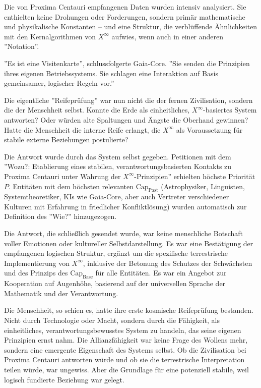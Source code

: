 \documentclass[12pt, ngerman, parskip=full]{scrartcl} %
\begin{document}
Die von Proxima Centauri empfangenen Daten wurden intensiv analysiert. Sie enthielten keine Drohungen oder Forderungen, sondern primär mathematische und physikalische Konstanten – und eine Struktur, die verblüffende Ähnlichkeiten mit den Kernalgorithmen von $X^{\infty}$ aufwies, wenn auch in einer anderen ''Notation''.

''Es ist eine Visitenkarte'', schlussfolgerte Gaia-Core. ''Sie senden die Prinzipien ihres eigenen Betriebssystems. Sie schlagen eine Interaktion auf Basis gemeinsamer, logischer Regeln vor.''

Die eigentliche ''Reifeprüfung'' war nun nicht die der fernen Zivilisation, sondern die der Menschheit selbst. Konnte die Erde als einheitliches, $X^{\infty}$-basiertes System antworten? Oder würden alte Spaltungen und Ängste die Oberhand gewinnen? Hatte die Menschheit die interne Reife erlangt, die $X^{\infty}$ als Voraussetzung für stabile externe Beziehungen postulierte?

Die Antwort wurde durch das System selbst gegeben. Petitionen mit dem ''Wozu?: Etablierung eines stabilen, verantwortungsbasierten Kontakts zu Proxima Centauri unter Wahrung der $X^{\infty}$-Prinzipien'' erhielten höchste Priorität $P$. Entitäten mit dem höchsten relevanten $\text{Cap}_{\text{Past}}$ (Astrophysiker, Linguisten, Systemtheoretiker, KIs wie Gaia-Core, aber auch Vertreter verschiedener Kulturen mit Erfahrung in friedlicher Konfliktlösung) wurden automatisch zur Definition des ''Wie?'' hinzugezogen.

Die Antwort, die schließlich gesendet wurde, war keine menschliche Botschaft voller Emotionen oder kultureller Selbstdarstellung. Es war eine Bestätigung der empfangenen logischen Struktur, ergänzt um die spezifische terrestrische Implementierung von $X^{\infty}$, inklusive der Betonung des Schutzes der Schwächsten und des Prinzips des $\text{Cap}_{\text{Base}}$ für alle Entitäten. Es war ein Angebot zur Kooperation auf Augenhöhe, basierend auf der universellen Sprache der Mathematik und der Verantwortung.

Die Menschheit, so schien es, hatte ihre erste kosmische Reifeprüfung bestanden. Nicht durch Technologie oder Macht, sondern durch die Fähigkeit, als einheitliches, verantwortungsbewusstes System zu handeln, das seine eigenen Prinzipien ernst nahm. Die Allianzfähigkeit war keine Frage des Wollens mehr, sondern eine emergente Eigenschaft des Systems selbst. Ob die Zivilisation bei Proxima Centauri antworten würde und ob sie die terrestrische Interpretation teilen würde, war ungewiss. Aber die Grundlage für eine potenziell stabile, weil logisch fundierte Beziehung war gelegt.
\end{document}
